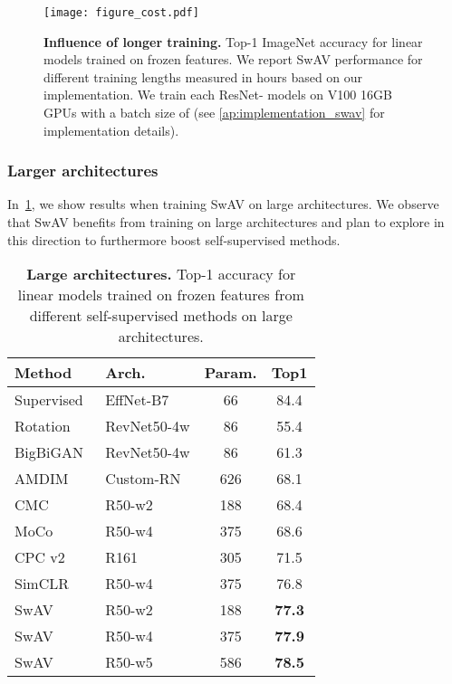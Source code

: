 \documentclass{article}
\def\OURS{SwAV\xspace}
\newcommand{\resnetfifty}{R50}
\begin{document}
\begin{figure}[h]
\begin{minipage}{0.5\linewidth}
\centering
\texttt{[image: figure\_cost.pdf]}
\end{minipage}
\begin{minipage}{0.5\linewidth}
\caption{
\textbf{Influence of longer training.}
Top-1 ImageNet accuracy for linear models trained on frozen features.
We report \OURS performance for different training lengths measured in hours based on our implementation.
We train each ResNet- models on  V100 16GB GPUs with a batch size of  (see \cref{ap:implementation_swav} for implementation details).
} 
\label{fig:cost}
\end{minipage}
\end{figure}

\subsubsection{Larger architectures}
In~\cref{tab:larger}, we show results when training \OURS on large architectures.
We observe that \OURS benefits from training on large architectures and plan to explore in this direction to furthermore boost self-supervised methods.
\begin{table}[h]
\centering
  \caption{
\textbf{Large architectures.}
Top-1 accuracy for linear models trained on frozen features from different self-supervised methods on large architectures.
}
\vspace{.3em}
\begin{tabular}{@{} l l c c @{}}
\toprule
Method      & Arch. & Param. & Top1  \\
\midrule
Supervised & EffNet-B7    & 66  & 84.4  \\
      \midrule
      Rotation~\cite{gidaris2018unsupervised} & RevNet50-4w     & 86  & 55.4 \\
      BigBiGAN~\cite{donahue2019large}        & RevNet50-4w     & 86  & 61.3 \\
      AMDIM~\cite{bachman2019learning}         & Custom-RN       & 626 & 68.1 \\
      CMC~\cite{tian2019contrastive}           & \resnetfifty-w2 & 188 & 68.4 \\
      MoCo~\cite{he2019momentum}               & \resnetfifty-w4 & 375 & 68.6 \\
      CPC v2~\cite{henaff2019data}             & R161            & 305 & 71.5 \\
      SimCLR~\cite{chen2020simple}             & \resnetfifty-w4 & 375 & 76.8 \\
      \midrule
      \OURS                             & \resnetfifty-w2 & 188 & \bf 77.3 \\
      \OURS                             & \resnetfifty-w4 & 375 & \bf 77.9 \\
      \OURS                             & \resnetfifty-w5 & 586 & \bf 78.5 \\
    \bottomrule
 \end{tabular}
  \label{tab:larger}
\end{table}
\end{document}
